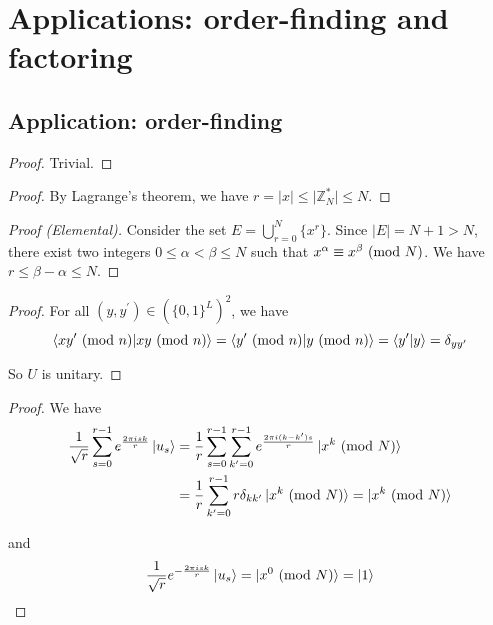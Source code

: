 \documentclass[../main.tex]{subfiles}
\begin{document}
\setcounter{chapter}{5}
\setcounter{section}{2}
\setcounter{exercise}{9}
\section{Applications: order-finding and factoring}
\subsection{Application: order-finding}

\begin{exercise}
\end{exercise}
\begin{proof}
Trivial.
\end{proof}

\bigskip
\begin{exercise}
\end{exercise}
\begin{proof}
By Lagrange's theorem, we have $r=\lvert x\rvert\leq\lvert\mathbb{Z}_N^*\rvert\leq N$.
\end{proof}
\begin{proof}[Proof (Elemental)]
Consider the set $E=\bigcup_{r=0}^N\{x^r\}$. Since $\lvert E\rvert=N+1>N$, there exist two integers $0\leq\alpha<\beta\leq N$ such that $x^\alpha\equiv x^\beta\ (\mathrm{mod}\ N)$. We have $r\leq\beta-\alpha\leq N$.
\end{proof}

\bigskip
\begin{exercise}
\end{exercise}
\begin{proof}
For all $(y,y^\prime)\in(\{0,1\}^L)^2$, we have
\[
    \braket{x y^\prime\ (\mathrm{mod}\ n)\vert x y\ (\mathrm{mod}\ n)}=\braket{y^\prime\ (\mathrm{mod}\ n)\vert y\ (\mathrm{mod}\ n)}=\braket{y^\prime\vert y}=\delta_{y y^\prime}
\]

So $U$ is unitary.
\end{proof}

\bigskip
\begin{exercise}
\end{exercise}
\begin{proof}
We have
\begin{align*}
    \frac{1}{\sqrt{r}}\sum_{s=0}^{r-1}e^{\frac{2\pi i s k}{r}}\ket{u_s}
    &= \frac{1}{r}\sum_{s=0}^{r-1}\sum_{k^\prime=0}^{r-1}e^{\frac{2\pi i(k-k^\prime)s}{r}}\ket{x^k\ (\mathrm{mod}\ N)} \\
    &= \frac{1}{r}\sum_{k^\prime=0}^{r-1}r\delta_{k k^\prime}\ket{x^k\ (\mathrm{mod}\ N)} = \ket{x^k\ (\mathrm{mod}\ N)}
\end{align*}

and
\[
    \frac{1}{\sqrt{r}}e^{-\frac{2\pi i s k}{r}}\ket{u_s}=\ket{x^0\ (\mathrm{mod}\ N)}=\ket{1}
\]
\end{proof}
\end{document}
